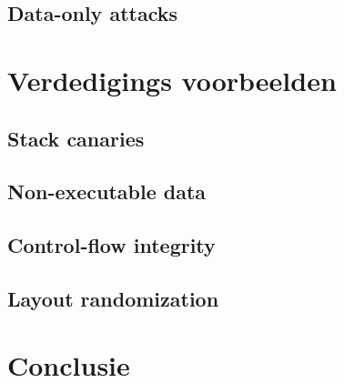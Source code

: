 \documentclass[../main.tex]{subfiles}
\begin{document}
\subsection{Data-only attacks}
\section{Verdedigings voorbeelden}
\subsection{Stack canaries}
\subsection{Non-executable data}
\subsection{Control-flow integrity}
\subsection{Layout randomization}
\section{Conclusie}
\end{document}
